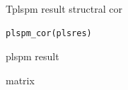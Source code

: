 \documentclass[a4paper]{book}
\begin{document}
%
\begin{Description}
Tplspm result structral cor
\end{Description}
%
\begin{Usage}
\begin{verbatim}
plspm_cor(plsres)
\end{verbatim}
\end{Usage}
%
\begin{Arguments}
\begin{ldescription}
\item[\code{plsres}] plspm result
\end{ldescription}
\end{Arguments}
%
\begin{Value}
matrix
\end{Value}
\end{document}
